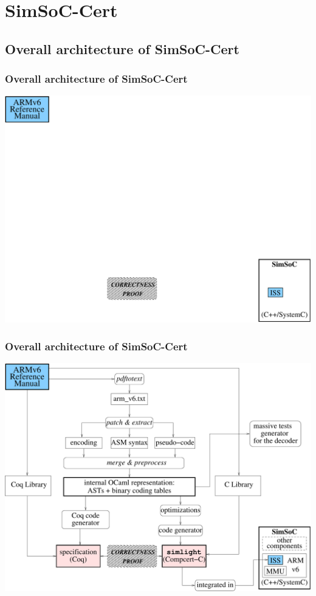 \documentclass[usenames,dvipsnames]{beamer} %
\begin{document}
\section{SimSoC-Cert}


\subsection{Overall architecture of SimSoC-Cert}
\begin{frame}
\frametitle{Overall architecture of SimSoC-Cert}
\hfil\includegraphics[width=.9\linewidth]{fig/maingen.pdf}
\end{frame}

\begin{frame}
\frametitle{Overall architecture of SimSoC-Cert}
\hfil\includegraphics[width=.9\linewidth]{fig/fullarchi.pdf}
\end{frame}
\end{document}
